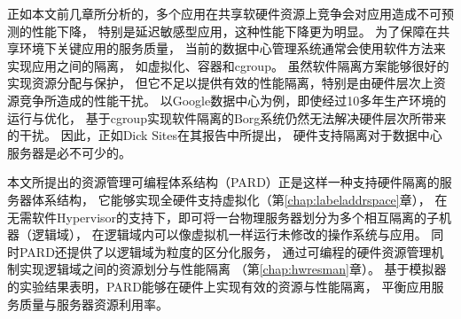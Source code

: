 %
%
正如本文前几章所分析的，多个应用在共享软硬件资源上竞争会对应用造成不可预测的性能下降，
特别是延迟敏感型应用，这种性能下降更为明显。
为了保障在共享环境下关键应用的服务质量，
当前的数据中心管理系统通常会使用软件方法来实现应用之间的隔离，
如虚拟化、容器和cgroup。
虽然软件隔离方案能够很好的实现资源分配与保护，
但它不足以提供有效的性能隔离，特别是由硬件层次上资源竞争所造成的性能干扰。
以Google数据中心为例，即使经过10多年生产环境的运行与优化，
基于cgroup实现软件隔离的Borg系统仍然无法解决硬件层次所带来的干扰\cite{borg:2015}。
因此，正如Dick Sites在其报告\cite{Dick:2015}中所提出，
硬件支持隔离对于数据中心服务器是必不可少的。

本文所提出的资源管理可编程体系结构（PARD）正是这样一种支持硬件隔离的服务器体系结构，
它能够实现全硬件支持虚拟化（第\ref{chap:labeladdrspace}章），
在无需软件Hypervisor的支持下，即可将一台物理服务器划分为多个相互隔离的子机器（逻辑域），
在逻辑域内可以像虚拟机一样运行未修改的操作系统与应用。
同时PARD还提供了以逻辑域为粒度的区分化服务，
通过可编程的硬件资源管理机制实现逻辑域之间的资源划分与性能隔离
（第\ref{chap:hwresman}章）。
基于模拟器的实验结果表明，PARD能够在硬件上实现有效的资源与性能隔离，
平衡应用服务质量与服务器资源利用率。


